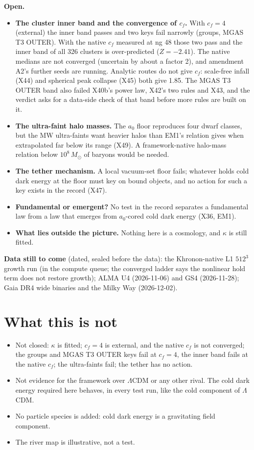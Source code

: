 \documentclass[10pt]{article}
\begin{document}
\textbf{Open.}
\begin{itemize}
\item \textbf{The cluster inner band and the convergence of $c_f$.} With $c_f=4$ (external) the inner band passes and two keys fail narrowly (groups, MGAS T3 OUTER). With the native $c_f$ measured at ng 48 those two pass and the inner band of all 326 clusters is over-predicted ($Z=-2.41$). The native medians are not converged (uncertain by about a factor 2), and amendment A2's further seeds are running. Analytic routes do not give $c_f$: scale-free infall (X44) and spherical peak collapse (X45) both give 1.85. The MGAS T3 OUTER band also failed X40b's power law, X42's two rules and X43, and the verdict asks for a data-side check of that band before more rules are built on it.
\item \textbf{The ultra-faint halo masses.} The $a_0$ floor reproduces four dwarf classes, but the MW ultra-faints want heavier halos than EM1's relation gives when extrapolated far below its range (X49). A framework-native halo-mass relation below $10^{8}\,M_\odot$ of baryons would be needed.
\item \textbf{The tether mechanism.} A local vacuum-set floor fails; whatever holds cold dark energy at the floor must key on bound objects, and no action for such a key exists in the record (X47).
\item \textbf{Fundamental or emergent?} No test in the record separates a fundamental law from a law that emerges from $a_0$-cored cold dark energy (X36, EM1).
\item \textbf{What lies outside the picture.} Nothing here is a cosmology, and $\kappa$ is still fitted.
\end{itemize}

\textbf{Data still to come} (dated, sealed before the data): the Khronon-native L1 $512^3$ growth run (in the compute queue; the converged ladder says the nonlinear hold term does not restore growth); ALMA U4 (2026-11-06) and GS4 (2026-11-28); Gaia DR4 wide binaries and the Milky Way (2026-12-02).

\section{What this is not}
\begin{itemize}
\item Not closed: $\kappa$ is fitted; $c_f=4$ is external, and the native $c_f$ is not converged; the groups and MGAS T3 OUTER keys fail at $c_f=4$, the inner band fails at the native $c_f$; the ultra-faints fail; the tether has no action.
\item Not evidence for the framework over $\Lambda$CDM or any other rival. The cold dark energy required here behaves, in every test run, like the cold component of $\Lambda$CDM.
\item No particle species is added: cold dark energy is a gravitating field component.
\item The river map is illustrative, not a test.
\end{itemize}
\end{document}
